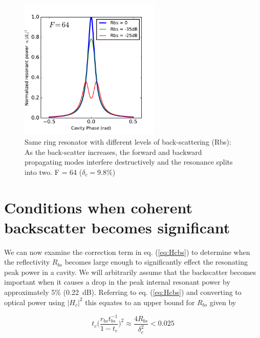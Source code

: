 \documentclass[10pt]{article}
\begin{document}



\begin{figure}[htbp]
\centering\includegraphics[width=0.6\textwidth]{figures/bs_split.pdf}
\caption{
Same ring resonator with different levels of back-scattering (Rbs):
As the back-scatter increases, the forward and backward propagating modes interfere destructively and the resonance splits into two.
F = 64 ($\delta_c = 9.8\%$)
} 
\label{fig:bs_split}
\end{figure}


\section{Conditions when coherent backscatter becomes significant}

We can now examine the correction term in eq. (\ref{eq:Hcbs}) to determine when the reflectivity $R_{bs}$ becomes large enough to significantly effect the resonating peak power in a cavity.   We will arbitrarily assume that the backscatter becomes important when it causes a drop in the peak internal resonant power by approximately 5\% (0.22~dB).  Referring to eq. (\ref{eq:Hcbs}) and  converting to optical power using $|H_c|^2$ this equates to an upper bound for $R_{bs}$ given by



\begin{equation}
t_c \Big(\frac{r_{bs} t_{bs}^{-1}}{1-t_c}\Big)^2  \approx \frac{4 R_{bs}}{\delta_c^2} < 0.025  
\end{equation}
\end{document}
